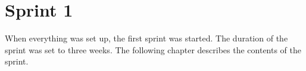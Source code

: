 \chapter{Sprint 1}
When everything was set up, the first sprint was started. The duration of the sprint was set to three weeks. The following chapter describes the contents of the sprint. 
